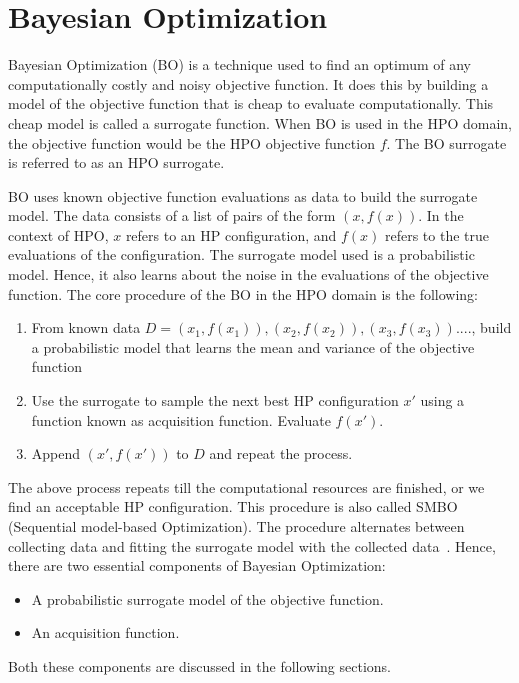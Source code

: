 \documentclass[12pt, twoside, ngerman]{report}
\begin{document}
\section{Bayesian Optimization}
\label{sec:BayesianOptimization}

Bayesian Optimization (BO) is a technique used to find an optimum of any computationally costly and noisy objective function.
It does this by building a model of the objective function that is cheap to evaluate computationally. This cheap model is called a surrogate function.
When BO is used in the HPO domain, the objective function would be the HPO objective function $f$. The BO surrogate is referred to as an HPO surrogate.

BO uses known objective function evaluations as data to build the surrogate model. The data consists of a list of pairs of the form $(x, f(x))$. In the context of HPO, $x$ refers to an HP configuration, and $f(x)$ refers to the true evaluations of the configuration.
The surrogate model used is a probabilistic model. Hence, it also learns about the noise in the evaluations of the objective function.
The core procedure of the BO in the HPO domain is the following:
\begin{enumerate}
\item From known data $D = {(x_1, f(x_1)), (x_2, f(x_2)), (x_3, f(x_3)) .... }$, build a probabilistic model that learns the mean and variance of the objective function
\item Use the surrogate to sample the next best HP configuration $x'$ using a function known as acquisition function. Evaluate $f(x')$.
\item Append $(x', f(x'))$ to $D$ and repeat the process.
\end{enumerate}

The above process repeats till the computational resources are finished, or we find an acceptable HP configuration.
This procedure is also called SMBO (Sequential model-based Optimization).
The procedure alternates between collecting data and fitting the surrogate model with the collected data~\cite{SMBOPaper}.
Hence, there are two essential components of Bayesian Optimization:
\begin{itemize}
\item A probabilistic surrogate model of the objective function.
\item An acquisition function.
\end{itemize}
Both these components are discussed in the following sections.
\end{document}
